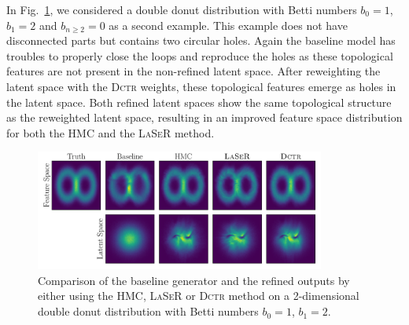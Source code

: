 In Fig.~\ref{fig:donut}, we considered a double donut distribution with Betti numbers $b_0=1$, $b_{1}=2$ and $b_{n\ge2}=0$ as a second example.
This example does not have disconnected parts but contains two circular holes. Again the baseline model has troubles to properly close the loops and reproduce the holes as these topological features are not present in the non-refined latent space. After reweighting the latent space with the \textsc{Dctr} weights, these topological features emerge as holes in the latent space. Both refined latent spaces show the same topological structure as the reweighted latent space, resulting in an improved feature space distribution for both the HMC and the \textsc{LaSeR} method.
%
\begin{figure}[!htbp]
    \centering
    \includegraphics[width=0.85\textwidth]{./figures/LSR/double_donut.pdf}
  \caption{Comparison of the baseline generator and the refined outputs by either using the HMC, \textsc{LaSeR} or \textsc{Dctr} method on a 2-dimensional double donut distribution with Betti numbers $b_0=1$, $b_1=2$.}
  \label{fig:donut}
\end{figure}
%

